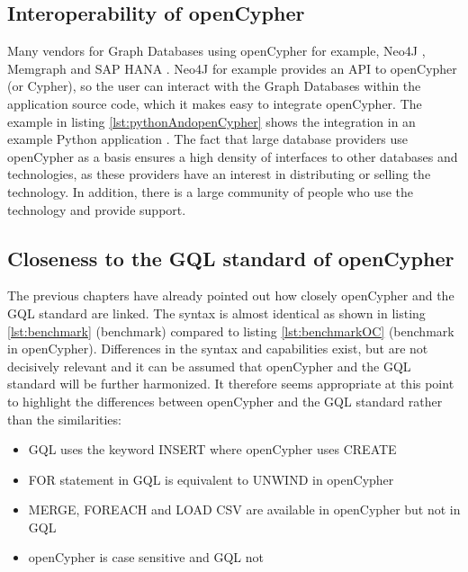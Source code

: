 \subsection{Interoperability of openCypher}
\label{subsec:different_query_languages_for_graph_databases:openCypher:interoperability}
Many vendors for Graph Databases using openCypher for example, Neo4J \citep{noauthor_neo4j_223}, Memgraph \citep{10391694} and SAP HANA \citep{bach_testing_2022}.
Neo4J for example provides an API to openCypher (or Cypher), so the user can interact
with the Graph Databases within the application source code, which it makes easy to 
integrate openCypher. 
The example in listing \ref{lst:pythonAndopenCypher} shows the integration in an example Python application \citep{noauthor_neo4j_223}.
The fact that large database providers use openCypher as a basis ensures a high density of interfaces 
to other databases and technologies, as these providers have an interest in distributing or selling the technology. 
In addition, there is a large community of people who use the technology and provide support. 

\subsection{Closeness to the GQL standard of openCypher}
\label{subsec:different_query_languages_for_graph_databases:openCypher:iso}
The previous chapters have already pointed out how closely openCypher 
and the GQL standard are linked. 
The syntax is almost identical as shown in listing \ref{lst:benchmark} (benchmark) compared to listing \ref{lst:benchmarkOC} (benchmark in openCypher). 
Differences in the syntax and capabilities exist, 
but are not decisively relevant and it can be assumed that openCypher 
and the GQL standard will be further harmonized. 
It therefore seems appropriate at this point to highlight the differences 
between openCypher and the GQL standard rather than the similarities:
\begin{itemize}
	\item GQL uses the keyword INSERT where openCypher uses CREATE
	\item FOR statement in GQL is equivalent to UNWIND in openCypher
	\item MERGE, FOREACH and LOAD CSV are available in openCypher but not in GQL
	\item openCypher is case sensitive and GQL not
\end{itemize}


